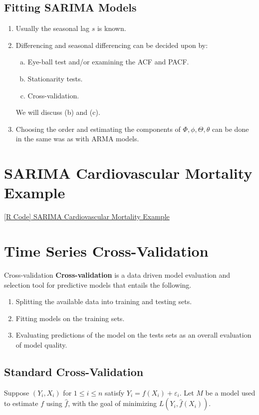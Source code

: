 \subsection*{Fitting SARIMA Models}
\begin{enumerate}[(1)]
      \item Usually the seasonal lag $ s $ is known.
      \item Differencing and seasonal differencing can be decided upon by:
            \begin{enumerate}[(a)]
                  \item Eye-ball test and/or examining the ACF and PACF\@.
                  \item Stationarity tests.
                  \item Cross-validation.
            \end{enumerate}
            {\color{blue}We will discuss (b) and (c).}
      \item Choosing the order and estimating the components of $ \Phi,\phi,\Theta,\theta $
            can be done in the same was as with ARMA models.
\end{enumerate}
\section{SARIMA Cardiovascular Mortality Example}
\href{https://github.com/Hextical/university-notes/blob/master/year-3/semester-2/STAT%20443/code/6.2%20-%20SARIMA%20Cmort%20Example.R}{[R Code] SARIMA Cardiovascular Mortality Example}
\section{Time Series Cross-Validation}
\begin{Definition}{Cross-validation}{}
      \textbf{Cross-validation} is a data driven model evaluation
      and selection tool for predictive models that entails the following.
      \begin{enumerate}[(1)]
            \item Splitting the available data into training and testing sets.
            \item Fitting models on the training sets.
            \item Evaluating predictions of the model on the tests sets as an overall
                  evaluation of model quality.
      \end{enumerate}
\end{Definition}
\subsection*{Standard Cross-Validation}
Suppose $ (Y_i,X_i) $ for $ 1\le i\le n $ satisfy $ Y_i=f(X_i)+\varepsilon_i $.
Let $ M $ be a model used to estimate $ f $ using $ \hat{f} $,
with the goal of minimizing $ L(Y_i,\hat{f}(X_i)) $.
